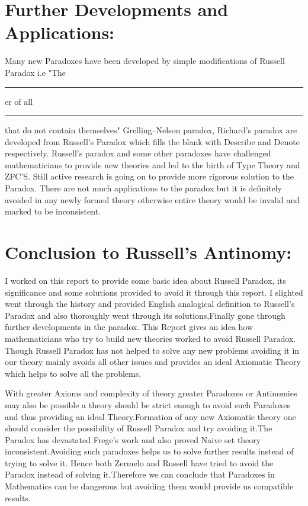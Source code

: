 \documentclass[a4paper]{article}
\begin{document}
\section{Further Developments and Applications:}
Many new Paradoxes have been developed by simple modifications of 
Russell Paradox i.e "The \rule{1cm}{0.15mm} er  of all 
\rule{1cm}{0.15mm} that do not contain themselves" Grelling–Nelson
paradox, Richard's paradox are developed from Russell's Paradox
which fills the blank with Describe and Denote respectively.
Russell's paradox and some other paradoxes have challenged
mathematicians to provide new theories and led to the birth of 
Type Theory and ZFC'S. Still active research is going on to 
provide more rigorous solution to the Paradox.
There are not much applications to the paradox but it is definitely
avoided in any newly formed theory otherwise entire theory would
be invalid and marked to be inconsistent.

\section{Conclusion to Russell's Antinomy:}
I worked on this report to provide some basic idea about Russell
Paradox, its significance and some solutions provided to avoid it
through this report. I slighted went through the history and 
provided English analogical definition to Russell's Paradox and 
also thoroughly went through its solutions,Finally gone through 
further developments in the paradox. This Report gives an idea how
mathematicians who try to build new theories worked to avoid Russell
Paradox. Though Russell Paradox has not helped to solve 
any new problems avoiding it in our theory mainly avoids all other
issues and provides an ideal Axiomatic Theory which helps to 
solve all the problems.

\newpage
\noindent With greater Axioms and complexity of theory greater
Paradoxes or Antinomies may also be possible a theory should be 
strict enough to avoid such Paradoxes and thus providing an ideal
Theory.Formation of any new  Axiomatic theory one should consider the
possibility of Russell Paradox and try avoiding it.The Paradox has 
devastated Frege's work and also proved Naive set theory
inconsistent.Avoiding such paradoxes helps us to solve further results
instead of trying to solve it. Hence both Zermelo and Russell have 
tried to avoid the Paradox instead of solving it.Therefore we can 
conclude that Paradoxes in Mathematics can be dangerous but avoiding
them would provide us compatible results.
\end{document}
